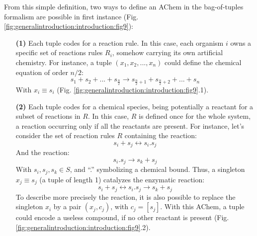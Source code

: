 From this simple definition, two ways to define an AChem in the bag-of-tuples formalism are possible in first instance (Fig. \ref{fig:generalintroduction:introduction:fig9}):
\begin{enumerate}
\item[\textbf{(1)}] Each tuple codes for a reaction rule. In this case, each organism $i$ owns a specific set of reactions rules $R_i$, somehow carrying its own artificial chemistry. For instance, a tuple $(x_1,x_2,...,x_n)$ could define the chemical equation of order $n/2$:
\begin{equation}
s_1 + s_2 + ... + s_{\frac{n}{2}} \rightarrow s_{\frac{n}{2}+1} + s_{\frac{n}{2}+2} + ... + s_n
\end{equation}
With $x_i \equiv s_i$ (Fig. \ref{fig:generalintroduction:introduction:fig9}.1).
\item[\textbf{(2)}] Each tuple codes for a chemical species, being potentially a reactant for a subset of reactions in $R$. In this case, $R$ is defined once for the whole system, a reaction occurring only if all the reactants are present. For instance, let's consider the set of reaction rules $R$ containing the reaction:
\begin{equation}
s_i + s_j \leftrightarrow s_i . s_j
\label{eq:reaction1}
\end{equation}
And the reaction:
\begin{equation}
s_i . s_j \rightarrow s_k + s_j
\label{eq:reaction2}
\end{equation}
With $s_i, s_j, s_k \in S$, and ``.'' symbolizing a chemical bound. Thus, a singleton $x_j \equiv s_j$ (a tuple of length 1) catalyzes the enzymatic reaction:
\begin{equation}
s_i + s_j \leftrightarrow s_i . s_j \rightarrow s_k + s_j
\label{eq:reaction3}
\end{equation}
To describe more precisely the reaction, it is also possible to replace the singleton $x_i$ by a pair $(x_j, c_j)$, with $c_j = [s_j]$. With this AChem, a tuple could encode a useless compound, if no other reactant is present (Fig. \ref{fig:generalintroduction:introduction:fig9}.2).
\end{enumerate}

